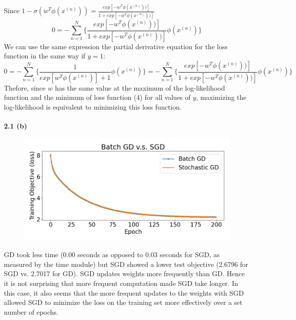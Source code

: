 \documentclass[12 pt]{article}        	%
\begin{document}
Since $ 1 - \sigma(w^T \phi(x^{(n)})) = \frac{ exp [ - w^T \phi(x^{(n)})) ] } { 1 + exp[ - w^T \phi(x^{(n)})) ] }  $
\begin{displaymath}
0 = - \sum_{n=1}^{N} \{
    \frac{ exp [ - w^T \phi(x^{(n)})) ] } { 1 + exp[ - w^T \phi(x^{(n)})) ] } 
    \phi(x^{(n)})
  \}
\end{displaymath}
We can use the same expression the partial derivative equation for the loss function in the same way 
if $ y = 1 $: 
\begin{displaymath}
  0 = - \sum_{n=1}^{N} \{
    \frac{1} {exp [w^T \phi(x^{(n)})] + 1 } \phi(x^{(n)}) 
  \}
  =
  - \sum_{n=1}^{N} \{
    \frac{ exp [ - w^T \phi(x^{(n)})) ] } { 1 + exp[ - w^T \phi(x^{(n)})) ] } 
    \phi(x^{(n)})
  \}
\end{displaymath}
Thefore, since $ w $ has the same value at the maximum of the log-likelihood function 
and the minimum of loss function (4) for all values of $ y $, maximizing the log-likelihood 
is equivalent to minimizing this loss function. \\ \\

\textbf{2.1 (b)} 

\begin{figure}[h!]
  \includegraphics[width=\linewidth]{gd_vs_sgd.png}
\end{figure}

GD took less time (0.00 seconds as opposed to 0.03 seconds for SGD, as measured by the time module)
but SGD showed a lower test objective (2.6796 for SGD vs. 2.7017 for GD). 
SGD updates weights more frequently than GD. Hence it is not surprising
that more frequent computation made SGD take longer. 
In this case, it also seems that the more frequent updates to the weights with SGD 
allowed SGD to minimize the loss on the training set more effectively over a set number
of epochs. 
\end{document}

